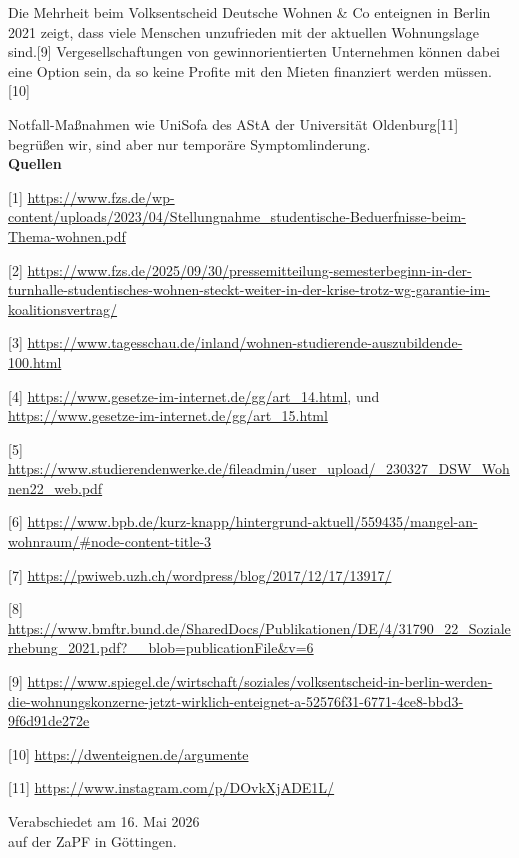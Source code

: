 \documentclass[DIV=calc]{scrartcl}
\let\oldgrqq=\grqq
\def\grqq{\oldgrqq\xspace}
\begin{document}
 Die Mehrheit beim Volksentscheid \glqq Deutsche Wohnen \& Co enteignen\grqq in Berlin 2021
 zeigt, dass viele Menschen unzufrieden mit der aktuellen Wohnungslage sind.[9]
 Vergesellschaftungen von gewinnorientierten Unternehmen können dabei eine Option
 sein, da so keine Profite mit den Mieten finanziert werden müssen.[10]

 Notfall-Maßnahmen wie \glqq UniSofa\grqq des AStA der Universität Oldenburg[11] begrüßen wir,
 sind aber nur temporäre Symptomlinderung.\\

 \textbf{Quellen}

 [1] \url{ https://www.fzs.de/wp-content/uploads/2023/04/Stellungnahme_studentische-Beduerfnisse-beim-Thema-wohnen.pdf}


 [2] \url{https://www.fzs.de/2025/09/30/pressemitteilung-semesterbeginn-in-der-turnhalle-studentisches-wohnen-steckt-weiter-in-der-krise-trotz-wg-garantie-im-koalitionsvertrag/}
 

 [3] \url{https://www.tagesschau.de/inland/wohnen-studierende-auszubildende-100.html}

 [4] \url{https://www.gesetze-im-internet.de/gg/art_14.html}, und
 \url{https://www.gesetze-im-internet.de/gg/art_15.html}

 [5] \url{https://www.studierendenwerke.de/fileadmin/user_upload/_230327_DSW_Wohnen22_web.pdf}

 [6] \url{https://www.bpb.de/kurz-knapp/hintergrund-aktuell/559435/mangel-an-wohnraum/#node-content-title-3}

 [7] \url{https://pwiweb.uzh.ch/wordpress/blog/2017/12/17/13917/}

 [8] \url{ https://www.bmftr.bund.de/SharedDocs/Publikationen/DE/4/31790_22_Sozialerhebung_2021.pdf?__blob=publicationFile&v=6}


 [9] \url{https://www.spiegel.de/wirtschaft/soziales/volksentscheid-in-berlin-werden-die-wohnungskonzerne-jetzt-wirklich-enteignet-a-52576f31-6771-4ce8-bbd3-9f6d91de272e}
 

 [10] \url{https://dwenteignen.de/argumente}

 [11] \url{https://www.instagram.com/p/DOvkXjADE1L/}







\vspace{1cm} 
%
\vfill
\begin{flushright}
	Verabschiedet am 16. Mai 2026 \\
	auf der ZaPF in Göttingen.
\end{flushright}
\end{document}
